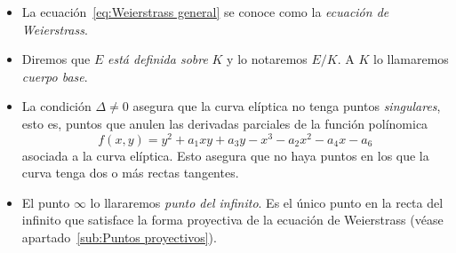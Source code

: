\begin{nota}\leavevmode
	\begin{itemize}
		\item La ecuación~\eqref{eq:Weierstrass general} se conoce como la \emph{ecuación de Weierstrass}.
		\item Diremos que $E$ \emph{está definida sobre} $K$ y lo notaremos $E/K$. A $K$ lo llamaremos \emph{cuerpo base}.
		\item La condición $\Delta \neq 0$ asegura que la curva elíptica no tenga puntos \emph{singulares}, esto es, puntos que anulen las derivadas parciales de la función polínomica
		$$
			f(x, y) = y^2 + a_1 x y + a_3 y - x^3 - a_2 x^2 - a_4 x - a_6
		$$
		asociada a la curva elíptica. Esto asegura que no haya puntos en los que la curva tenga dos o más rectas tangentes.
		\item El punto $\infty$ lo llararemos \emph{punto del infinito}. Es el único punto en la recta del infinito que satisface la forma proyectiva de la ecuación de Weierstrass (véase apartado~\ref{sub:Puntos proyectivos}).
	\end{itemize}
\end{nota}

